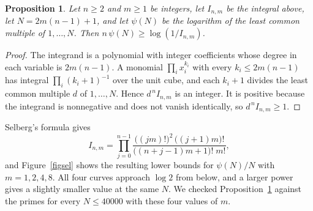 \documentclass[11pt,letterpaper]{article}
\newtheorem{proposition}[theorem]{Proposition}
\numberwithin{equation}{section}
\begin{document}
\begin{proposition}\label{selb}
Let $n\ge2$ and $m\ge1$ be integers, let $I_{n,m}$ be the integral above, let $N=2m(n-1)+1$, and let $\psi(N)$ be the logarithm of the least common multiple of $1,\dots,N$. Then $n\,\psi(N)\ge\log(1/I_{n,m})$.
\end{proposition}
\begin{proof}
The integrand is a polynomial with integer coefficients whose degree in each variable is $2m(n-1)$. A monomial $\prod_ix_i^{k_i}$ with every $k_i\le2m(n-1)$ has integral $\prod_i(k_i+1)^{-1}$ over the unit cube, and each $k_i+1$ divides the least common multiple $d$ of $1,\dots,N$. Hence $d^{\,n}I_{n,m}$ is an integer. It is positive because the integrand is nonnegative and does not vanish identically, so $d^{\,n}I_{n,m}\ge1$.
\end{proof}

Selberg's formula gives
\[
I_{n,m}=\prod_{j=0}^{n-1}\frac{\big((jm)!\big)^2\,\big((j+1)m\big)!}{\big((n+j-1)m+1\big)!\;m!},
\]
and Figure~\ref{figsel} shows the resulting lower bounds for $\psi(N)/N$ with $m=1,2,4,8$. All four curves approach $\log2$ from below, and a larger power gives a slightly smaller value at the same $N$. We checked Proposition~\ref{selb} against the primes for every $N\le40000$ with these four values of $m$.
\end{document}
